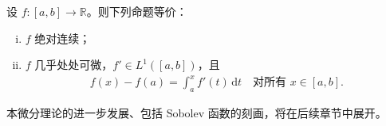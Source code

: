 \documentclass[../../main.tex]{subfiles}%
\begin{document}
\begin{theorem}\label{theorem:ch02-绝对连续刻画}
设 $f:[a,b]\to\mathbb R$。则下列命题等价：
\begin{enumerate}[(i)]
\item $f$ 绝对连续；
\item $f$ 几乎处处可微，$f'\in L^1([a,b])$，且
\begin{align*}
f(x)-f(a)=\int_a^x f'(t)\,\mathrm{d}t\quad\text{对所有 }x\in[a,b].
\end{align*}
\end{enumerate}
\end{theorem}

本微分理论的进一步发展、包括 Sobolev 函数的刻画，将在后续章节中展开。
\end{document}
